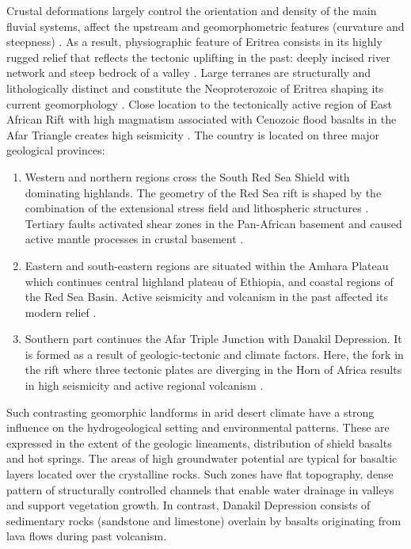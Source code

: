 \documentclass[sn-mathphys-num]{sn-jnl}%
\theoremstyle{thmstyleone}%
\theoremstyle{thmstyletwo}%
\theoremstyle{thmstylethree}%
\begin{document}
{Crustal deformations largely control the orientation and density of the main fluvial systems, affect the upstream and geomorphometric features (curvature and steepness) \cite{Abbate}. As a result{,} physiographic feature of Eritrea consists in its highly rugged relief {that reflects the tectonic uplifting in the past}: deeply incised river network and steep bedrock of a valley \cite{Billi2022b}. Large terranes are structurally and lithologically distinct and constitute the Neoproterozoic of Eritrea shaping its current geomorphology \cite{Markwick,Vanmaercke}. Close location to the tectonically active region of East African Rift with high magmatism associated with Cenozoic flood basalts in the Afar Triangle creates high seismicity \cite{Hammond}. {The country is located on} three major geological provinces:
 \begin{enumerate}
 	\item Western and northern regions cross the South Red Sea Shield with dominating highlands. The geometry of the Red Sea rift is shaped by the combination of the extensional stress field and lithospheric structures \cite{Issachar}. Tertiary faults activated shear zones in the Pan-African basement and caused active mantle processes in crustal basement \cite{Ebinger,Sembroni}.  
	 \item Eastern and south-eastern regions{ }are situated within the Amhara Plateau which continues central highland plateau of Ethiopia, and coastal regions of the Red Sea Basin. Active seismicity and volcanism in the past affected its modern relief \cite{HamielBaer}.
	 \item Southern part{ }continues the Afar Triple Junction with Danakil Depression. {It is }formed as a result of geologic-tectonic and climate factors. Here, the fork in the rift where three tectonic plates are diverging in the Horn of Africa results in high seismicity and active regional volcanism \cite{Illsley,Lemenkova202205}.  
 \end{enumerate}

{Such contrasting }geomorphic {landforms} in arid{ }desert climate {have} a strong influence on the {hydrogeological setting} and environmental patterns. These are expressed in the extent of the geologic lineaments, distribution of shield basalts and{ }hot springs. {The} areas of high groundwater potential are typical for basaltic layers located over the crystalline rocks. Such zones have flat topography, dense pattern of{ }structurally controlled{ }channels that enable water drainage in valleys and support vegetation growth. In contrast, Danakil Depression consists of sedimentary rocks (sandstone and limestone) overlain by basalts originating from lava flows during past volcanism.

}
\end{document}
